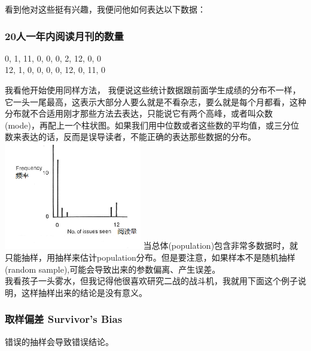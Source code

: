 看到他对这些挺有兴趣，我便问他如何表达以下数据：\\

\hypertarget{ux4ebaux4e00ux5e74ux5185ux9605ux8bfbux6708ux520aux7684ux6570ux91cf}{%
\subsubsection{20人一年内阅读月刊的数量}\label{ux4ebaux4e00ux5e74ux5185ux9605ux8bfbux6708ux520aux7684ux6570ux91cf}}

0, 1, 11, 0, 0, 0, 2, 12, 0, 0\\
12, 1, 0, 0, 0, 0, 12, 0, 11, 0

我看他开始使用同样方法，
我便说这些统计数据跟前面学生成绩的分布不一样，它一头一尾最高，这表示大部分人要么就是不看杂志，要么就是每个月都看，这种分布就不合适用刚才那些方法去表达，只能说它有两个高峰，或者叫众数(mode)，再配上一个柱状图。如果我们用中位数或者这些数的平均值，或三分位数来表达的话，反而是误导读者，不能正确的表达那些数据的分布。\\

\includegraphics[width=6cm]{MA_FA4_10.png}
当总体(population)包含非常多数据时，就只能抽样，用抽样来估计population分布。但是要注意，如果样本不是随机抽样(random
sample),可能会导致出来的参数偏离、产生误差。\\
我看孩子一头雾水，但我记得他很喜欢研究二战的战斗机，我就用下面这个例子说明，这样抽样出来的结论是没有意义。\\

\hypertarget{ux6837ux672cux504fux5dee-survivors-bias}{%
\subsubsection{取样偏差 Survivor's Bias}\label{ux6837ux672cux504fux5dee-survivors-bias}}

错误的抽样会导致错误结论。


